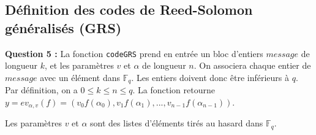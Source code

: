 \documentclass[titlepage]{article}
\begin{document}
        \subsection{Définition des codes de Reed-Solomon \\ généralisés (GRS)}

        \textbf{Question 5 :}
        La fonction \texttt{codeGRS} prend en entrée un bloc d'entiers $message$ de longueur $k$, et les paramètres $v$ et $\alpha$ de longueur $n$.
        On associera chaque entier de $message$ avec un élément dans $\mathbb{F}_q$. Les entiers doivent donc être inférieurs à $q$.
        Par définition, on a $0 \leqslant k \leqslant n \leqslant q$. La fonction retourne $y = ev_{\alpha,v}(f) = (v_0f(\alpha_0), v_1f(\alpha_1), ..., v_{n-1}f(\alpha_{n-1}))$.

        Les paramètres $v$ et $\alpha$ sont des listes d'éléments tirés au hasard dans $\mathbb{F}_q$.

        
\end{document}
